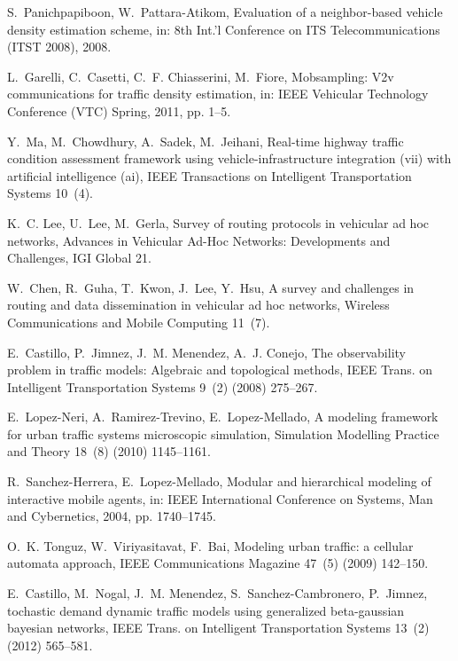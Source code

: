 \documentclass[10pt,onecolumn]{article}
\begin{document}
\begin{thebibliography}{00}
S.~Panichpapiboon, W.~Pattara-Atikom, Evaluation of a neighbor-based vehicle
  density estimation scheme, in: 8th Int.'l Conference on ITS
  Telecommunications (ITST 2008), 2008.

L.~Garelli, C.~Casetti, C.~F. Chiasserini, M.~Fiore, Mobsampling: V2v
  communications for traffic density estimation, in: IEEE Vehicular Technology
  Conference (VTC) Spring, 2011, pp. 1--5.

Y.~Ma, M.~Chowdhury, A.~Sadek, M.~Jeihani, Real-time highway traffic condition
  assessment framework using vehicle-infrastructure integration (vii) with
  artificial intelligence (ai), IEEE Transactions on Intelligent Transportation
  Systems 10~(4).

K.~C. Lee, U.~Lee, M.~Gerla, Survey of routing protocols in vehicular ad hoc
  networks, Advances in Vehicular Ad-Hoc Networks: Developments and Challenges,
  IGI Global 21.

W.~Chen, R.~Guha, T.~Kwon, J.~Lee, Y.~Hsu, A survey and challenges in routing
  and data dissemination in vehicular ad hoc networks, Wireless Communications
  and Mobile Computing 11~(7).

E.~Castillo, P.~Jimnez, J.~M. Menendez, A.~J. Conejo, The observability
  problem in traffic models: Algebraic and topological methods, IEEE Trans. on
  Intelligent Transportation Systems 9~(2) (2008) 275--267.

E.~Lopez-Neri, A.~Ramirez-Trevino, E.~Lopez-Mellado, A modeling framework for
  urban traffic systems microscopic simulation, Simulation Modelling Practice
  and Theory 18~(8) (2010) 1145--1161.

R.~Sanchez-Herrera, E.~Lopez-Mellado, Modular and hierarchical modeling of
  interactive mobile agents, in: IEEE International Conference on Systems, Man
  and Cybernetics, 2004, pp. 1740--1745.

O.~K. Tonguz, W.~Viriyasitavat, F.~Bai, Modeling urban traffic: a cellular
  automata approach, IEEE Communications Magazine 47~(5) (2009) 142--150.

E.~Castillo, M.~Nogal, J.~M. Menendez, S.~Sanchez-Cambronero, P.~Jimnez,
  tochastic demand dynamic traffic models using generalized beta-gaussian
  bayesian networks, IEEE Trans. on Intelligent Transportation Systems 13~(2)
  (2012) 565--581.


\end{thebibliography}
\end{document}

